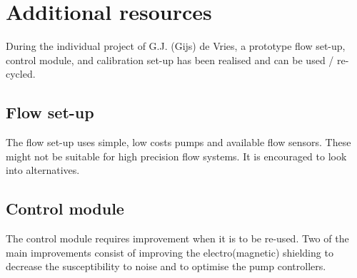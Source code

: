 \section{Additional resources}
During the individual project of G.J. (Gijs) de Vries, a prototype flow set-up, control module, and calibration set-up has been realised and can be used / re-cycled.
\subsection{Flow set-up}
The flow set-up uses simple, low costs pumps and available flow sensors. These might not be suitable for high precision flow systems. It is encouraged to look into alternatives.
\subsection{Control module}
The control module requires improvement when it is to be re-used. Two of the main improvements consist of improving the electro(magnetic) shielding to decrease the susceptibility to noise and to optimise the pump controllers.
